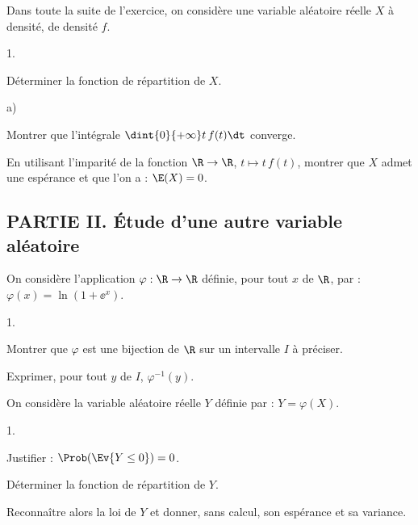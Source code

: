 \documentclass[11pt]{article}%
\begin{document}
\noindent
Dans toute la suite de l'exercice, on considère une variable aléatoire 
réelle $X$ à densité, de densité $f$.
\begin{noliste}{1.}
\setlength{\itemsep}{2mm}
\setcounter{enumi}{2}
\item Déterminer la fonction de répartition de $X$.




\item
\begin{noliste}{a)}
\item Montrer que l'intégrale $\dint{0}{+\infty}t \, f(t)\dt$ 
converge.



\item En utilisant l'imparité de la fonction $\R\to \R$, $t\mapsto t
  \, f(t)$, montrer que $X$ admet une espérance et que l'on a :
  $\E(X)=0$.



\end{noliste}
\end{noliste}

\subsection*{PARTIE II. Étude d'une autre variable aléatoire}

\noindent
On considère l'application $\varphi: \R\rightarrow\R$ définie, pour
tout $x$ de $\R$, par : $\varphi(x) = \ln(1+\ee^x)$.
\begin{noliste}{1.}
  \setlength{\itemsep}{2mm}%
  \setcounter{enumi}{4}
\item Montrer que $\varphi$ est une bijection de $\R$ sur un 
  intervalle $I$ à préciser.



\item Exprimer, pour tout $y$ de $I$, $\varphi^{-1}(y)$.



\end{noliste}




\noindent
On considère la variable aléatoire réelle $Y$ définie par : 
$Y=\varphi(X)$.
\begin{noliste}{1.}
\setlength{\itemsep}{2mm}
\setcounter{enumi}{6}
\item Justifier : $\Prob(\Ev{Y\leq 0})=0$.



\item Déterminer la fonction de répartition de $Y$.




\item Reconnaître alors la loi de $Y$ et donner, sans calcul, son 
espérance et sa variance.



\end{noliste}
\end{document}
